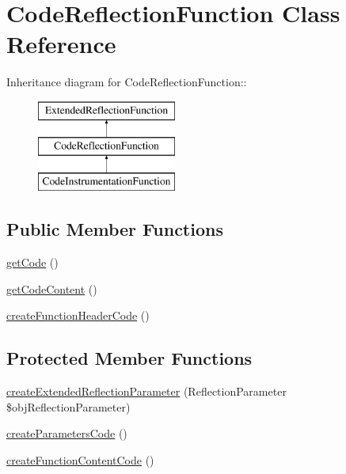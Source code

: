 \hypertarget{class_code_reflection_function}{
\section{CodeReflectionFunction Class Reference}
\label{class_code_reflection_function}
}
Inheritance diagram for CodeReflectionFunction::\begin{figure}[H]
\begin{center}
\leavevmode
\includegraphics[height=3cm]{class_code_reflection_function}
\end{center}
\end{figure}
\subsection*{Public Member Functions}
\begin{CompactItemize}
\item 
\hyperlink{class_code_reflection_function_eb645ce888eda144d361ccfd14eb9878}{getCode} ()
\item 
\hyperlink{class_code_reflection_function_11b5048c516be3731737308e5cddef79}{getCodeContent} ()
\item 
\hyperlink{class_code_reflection_function_f239516580c5c5e66c02bbe6c55d2f2f}{createFunctionHeaderCode} ()
\end{CompactItemize}
\subsection*{Protected Member Functions}
\begin{CompactItemize}
\item 
\hyperlink{class_code_reflection_function_7ce14d3f6e8579332f226d85fb439b80}{createExtendedReflectionParameter} (ReflectionParameter \$objReflectionParameter)
\item 
\hyperlink{class_code_reflection_function_003298f670f7915ad557ad10b777e0bb}{createParametersCode} ()
\item 
\hyperlink{class_code_reflection_function_3ea191f1a3ff9fa0b3505327e635d306}{createFunctionContentCode} ()
\end{CompactItemize}


